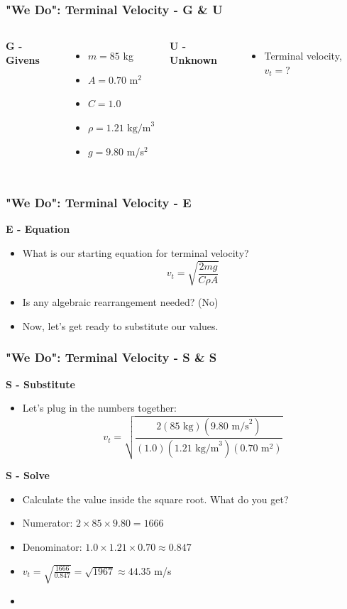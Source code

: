 \documentclass{beamer}
\begin{document}
\begin{frame}
\frametitle{"We Do": Terminal Velocity - G \& U}
\begin{columns}[T]
\textbf{G - Givens}
\begin{itemize}
    \item $m = 85$ kg
    \item $A = 0.70 \text{ m}^2$
    \item $C = 1.0$
    \item $\rho = 1.21 \text{ kg/m}^3$
    \item $g = 9.80$ m/s$^2$
\end{itemize}

\textbf{U - Unknown}
\begin{itemize}
    \item Terminal velocity, $v_t = ?$
\end{itemize}
\end{columns}
\end{frame}

\begin{frame}
\frametitle{"We Do": Terminal Velocity - E}
\textbf{E - Equation}
\begin{itemize}
    \item What is our starting equation for terminal velocity? \pause
    \[ v_t = \sqrt{\frac{2mg}{C \rho A}} \] \pause
    \item Is any algebraic rearrangement needed? (No) \pause
    \item Now, let's get ready to substitute our values.
\end{itemize}
\end{frame}

\begin{frame}
\frametitle{"We Do": Terminal Velocity - S \& S}
\textbf{S - Substitute}
\begin{itemize}
    \item Let's plug in the numbers together:
    \[ v_t = \sqrt{\frac{2(85 \text{ kg})(9.80 \text{ m/s}^2)}{(1.0)(1.21 \text{ kg/m}^3)(0.70 \text{ m}^2)}} \]
\end{itemize} \pause
\textbf{S - Solve}
\begin{itemize}
    \item Calculate the value inside the square root. What do you get?
    \item Numerator: $2 \times 85 \times 9.80 = 1666$
    \item Denominator: $1.0 \times 1.21 \times 0.70 \approx 0.847$ \pause
    \item $v_t = \sqrt{\frac{1666}{0.847}} = \sqrt{1967} \approx 44.35$ m/s
    \item {}
\end{itemize}
\end{frame}
\end{document}

